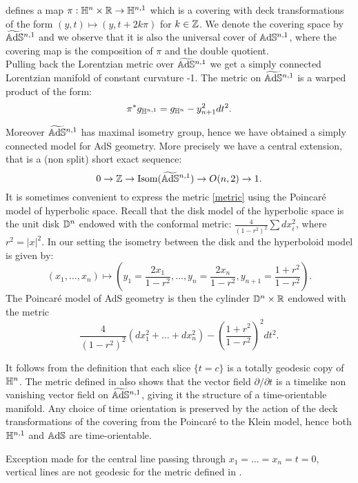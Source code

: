 defines a map $\pi:\mathbb{H}^n\times \mathbb{R}\to \mathbb{H}^{n,1}$ which is a covering with deck transformations of the form $(y,t)\mapsto (y,t+2k\pi)$ for $k\in \mathbb{Z}$. We denote the covering space by $\widetilde{\mathbb{A}\mathrm{d}\mathbb{S}}{}^{n,1}$ and we observe that it is also the universal cover of $\mathbb{A}\mathrm{d}\mathbb{S}^{n,1}$, where the covering map is the composition of $\pi$ and the double quotient.\\
Pulling back the Lorentzian metric over $\widetilde{\mathbb{A}\mathrm{d}\mathbb{S}}{}^{n,1}$ we get a simply connected Lorentzian manifold of constant curvature -1. The metric on $\widetilde{\mathbb{A}\mathrm{d}\mathbb{S}}{}^{n,1}$ is a warped product of the form: 
\begin{equation}\label{metric}
     \pi^*g_{\mathbb{H}^{n,1}}=g_{\mathbb{H}^n}-y_{n+1}^{2}dt^2.
\end{equation}
   

Moreover $\widetilde{\mathbb{A}\mathrm{d}\mathbb{S}}{}^{n,1}$ has maximal isometry group, hence we have obtained a simply connected model for AdS geometry. More precisely we have a central extension, that is a (non split) short exact sequence:
\[
    0\to \mathbb{Z}\to \textnormal{Isom}(\widetilde{\mathbb{A}\mathrm{d}\mathbb{S}}{}^{n,1})\to O(n,2)\to 1.
\]
It is sometimes convenient to express the metric \ref{metric} using the Poincaré model of hyperbolic space. Recall that the disk model of the hyperbolic space is the unit disk $\mathbb{D}^n$ endowed with the conformal metric: $\frac{4}{(1-r^2)^2}\sum dx_i^2$, where $r^2=\vert x\vert^2$. In our setting the isometry between the disk and the hyperboloid model is given by: 
\begin{equation}
    (x_1,\dots, x_n)\mapsto (y_1=\frac{2x_1}{1-r^2},\dots, y_n=\frac{2x_n}{1-r^2},y_{n+1}=\frac{1+r^2}{1-r^2}). 
\end{equation}
The Poincaré model of AdS geometry is then the cylinder $\mathbb{D}^n\times \mathbb{R}$ endowed with the metric 
\begin{equation}\label{metricdisk}
    \frac{4}{(1-r^2)^2}(dx_1^2+\dots+dx_n^2)-(\frac{1+r^2}{1-r^2})^{2}dt^2. 
\end{equation}

It follows from the definition that each slice $\{t=c\}$ is a totally geodesic copy of $\mathbb{H}^n$. The metric defined in  also shows that the vector field $\partial/\partial t$ is a timelike non vanishing vector field on $\widetilde{\mathbb{A}\mathrm{d}\mathbb{S}}{}^{n,1}$, giving it the structure of a time-orientable manifold. Any choice of time orientation is preserved by the action of the deck transformations of the covering from the Poincaré to the Klein model, hence both $\mathbb{H}^{n,1}$ and $\mathbb{A}\mathrm{d}\mathbb{S}$ are time-orientable. \\
\begin{observation}
    Exception made for the central line passing through $x_1=\dots=x_n=t=0,$ vertical lines are not geodesic for the metric defined in .  
\end{observation}

